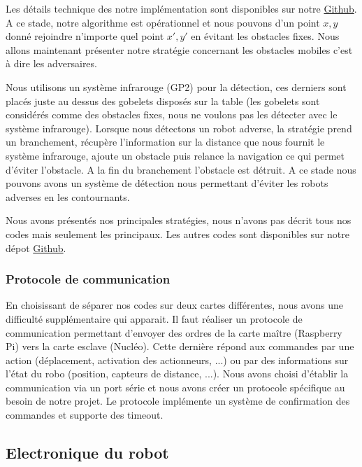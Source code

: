 \documentclass[a4paper,10pt]{article}
\begin{document}
\begin{spacing}{1.5}
Les détails technique des notre implémentation sont disponibles sur notre
\href{https://github.com/eirbot/eirbot2020-1A/blob/master/code/rasp/src/navigation.cpp}{Github}.
A ce stade, notre algorithme est opérationnel et nous pouvons d'un point $x,y$
donné rejoindre n'importe quel point $x',y'$ en évitant les obstacles fixes.
Nous allons maintenant présenter notre stratégie concernant les obstacles
mobiles c'est à dire les adversaires.

Nous utilisons un système infrarouge (GP2) pour la détection, ces derniers sont
placés juste au dessus des gobelets disposés sur la table (les gobelets sont
considérés comme des obstacles fixes, nous ne voulons pas les détecter avec le
système infrarouge). Lorsque nous détectons un robot adverse, la stratégie prend
un branchement, récupère l'information sur la distance que nous fournit le
système infrarouge, ajoute un obstacle puis relance la navigation ce qui permet d'éviter l'obstacle.
A la fin du branchement l'obstacle est détruit. A ce stade nous pouvons avons un
système de détection nous permettant d'éviter les robots adverses en les
contournants.

Nous avons présentés nos principales stratégies, nous n'avons pas décrit tous
nos codes mais seulement les principaux. Les autres codes sont disponibles sur
notre dépot \href{https://github.com/eirbot/eirbot2020-1A}{Github}.

\subsubsection{Protocole de communication}
En choisissant de séparer nos codes sur deux cartes différentes, nous avons une
difficulté supplémentaire qui apparait. Il faut réaliser un protocole de
communication permettant d'envoyer des ordres de la carte maître (Raspberry
Pi) vers la carte esclave (Nucléo). Cette dernière répond aux commandes par une
action (déplacement, activation des actionneurs, ...) ou par des
informations sur l'état du robo (position, capteurs de distance, ...). Nous
avons choisi d'établir la communication via un port série et nous avons créer un
protocole spécifique au besoin de notre projet. Le protocole implémente un
système de confirmation des commandes et supporte des timeout.


\subsection{Electronique du robot}


\end{spacing}
\end{document}
